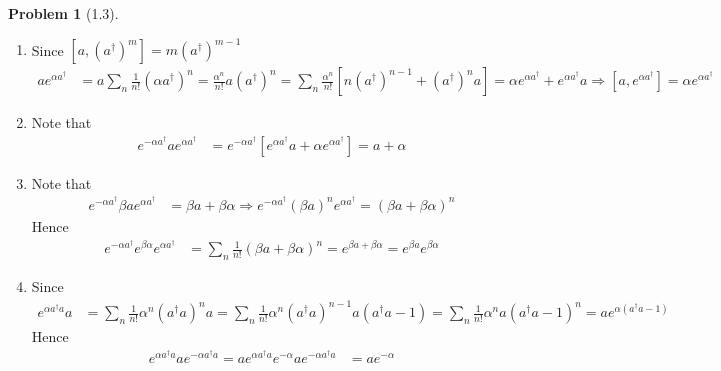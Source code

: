 \documentclass[twoside,11pt]{article}
\theoremstyle{definition}
\newtheorem{problem}{Problem}
\theoremstyle{remark}
\begin{document}
\begin{problem}[1.3]\
\begin{enumerate}[label=(\alph*)]
\item Since $[a, (a^\dagger)^m] = m(a^\dagger)^{m-1}$
\begin{align*}
    ae^{\alpha a^\dagger} &= 
    a\sum_{n}\frac{1}{n!}(\alpha a^\dagger)^n =
    \frac{\alpha^n}{n!}a(a^\dagger)^n = 
    \sum_n \frac{\alpha^n}{n!}
    \left[
        n (a^\dagger)^{n-1}  + (a^\dagger)^n a
    \right]
    = \alpha e^{\alpha a^\dagger} + e^{\alpha a^\dagger} a
    \Rightarrow [a, e^{\alpha a^\dagger}] = 
    \alpha e^{\alpha a^\dagger}
\end{align*}

\item Note that
\begin{align*}
    e^{-\alpha a^\dagger} a e^{\alpha a^\dagger} &= 
    e^{-\alpha a^\dagger}[e^{\alpha a^\dagger}a + \alpha e^{\alpha a^\dagger}]
    = a + \alpha
\end{align*}

\item Note that
\begin{align*}
    e^{-\alpha a^\dagger}\beta a e^{\alpha a^\dagger}
    &= 
    \beta a + \beta\alpha
    \Rightarrow
    e^{-\alpha a^\dagger}(\beta a)^n e^{\alpha a^\dagger}
    = (\beta a + \beta\alpha)^n
\end{align*}
Hence
\begin{align*}
    e^{-\alpha a^\dagger} e^{\beta \alpha}
    e^{\alpha a^\dagger} &= 
    \sum_n\frac{1}{n!}(\beta a + \beta \alpha)^n 
    = e^{\beta a + \beta\alpha}
    = e^{\beta a}e^{\beta\alpha}
\end{align*}

\item Since
\begin{align*}
    e^{\alpha a^\dagger a}a &=
    \sum_n \frac{1}{n!}\alpha^n (a^\dagger a)^n a =
    \sum_n \frac{1}{n!}\alpha^n (a^\dagger a)^{n-1} a (a^\dagger a - 1) =
    \sum_n \frac{1}{n!}\alpha^n a(a^\dagger a - 1)^n 
    = ae^{\alpha(a^\dagger a- 1)}
\end{align*}
Hence
\begin{align*}
    e^{\alpha a^\dagger a}a e^{-\alpha a^\dagger a}
    = ae^{\alpha a^\dagger a}e^{-\alpha} a e^{-\alpha a^\dagger a}
    &= ae^{-\alpha}
\end{align*}

\end{enumerate}
\label{prob:q2}
\end{problem}
\end{document}
